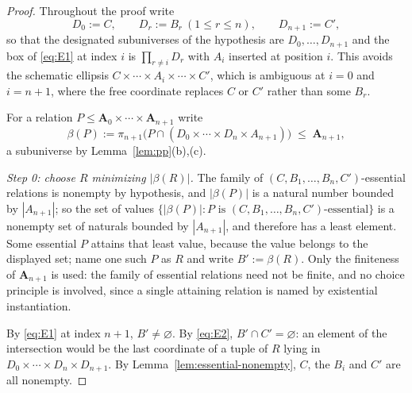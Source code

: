 \documentclass[11pt]{article}
\theoremstyle{mainplain}
\theoremstyle{mainroman}
\theoremstyle{definition}
\numberwithin{equation}{section}
\newcommand{\bA}{\mathbf A}
\begin{document}
\begin{proof}
Throughout the proof write
\[
 D_0:=C,\qquad D_r:=B_r\ (1\le r\le n),\qquad D_{n+1}:=C',
\]
so that the designated subuniverses of the hypothesis are $D_0,\dots,D_{n+1}$
and the box of \eqref{eq:E1} at index $i$ is
$\prod_{r\ne i}D_r$ with $A_i$ inserted at position $i$. This avoids the
schematic ellipsis $C\times\cdots\times A_i\times\cdots\times C'$, which is
ambiguous at $i=0$ and $i=n+1$, where the free coordinate replaces $C$ or $C'$
rather than some $B_r$.

For a relation $P\le\bA_0\times\cdots\times\bA_{n+1}$ write
\[
 \beta(P):=\pi_{n+1}\bigl(P\cap(D_0\times\cdots\times D_n\times A_{n+1})\bigr)\;\le\;\bA_{n+1},
\]
a subuniverse by Lemma~\ref{lem:pp}(b),(c).

\emph{Step 0: choose $R$ minimizing $|\beta(R)|$.} The family of
$(C,B_1,\dots,B_n,C')$-essential relations is nonempty by hypothesis, and
$|\beta(P)|$ is a natural number bounded by $|A_{n+1}|$; so the set of values
$\{|\beta(P)|:P\text{ is }(C,B_1,\dots,B_n,C')\text{-essential}\}$ is a
nonempty set of naturals bounded by $|A_{n+1}|$, and therefore has a least
element. Some essential $P$ attains that least value, because the value belongs
to the displayed set; name one such $P$ as $R$ and write $B':=\beta(R)$. Only
the finiteness of $\bA_{n+1}$ is used: the family of essential relations need
not be finite, and no choice principle is involved, since a single attaining
relation is named by existential instantiation.

By \eqref{eq:E1} at index $n+1$, $B'\ne\varnothing$. By \eqref{eq:E2},
$B'\cap C'=\varnothing$: an element of the intersection would be the last
coordinate of a tuple of $R$ lying in $D_0\times\cdots\times D_n\times D_{n+1}$.
By Lemma~\ref{lem:essential-nonempty}, $C$, the $B_i$ and $C'$ are all nonempty.


\end{proof}
\end{document}
